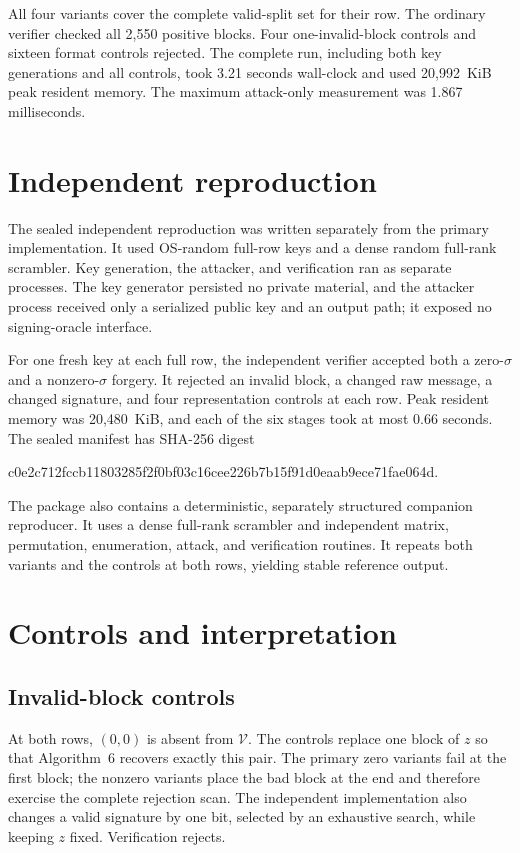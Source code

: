 \documentclass[10pt,a4paper]{article}
\newcommand{\VES}{\mathcal{V}}
\begin{document}
All four variants cover the complete valid-split set for their row.  The
ordinary verifier checked all 2,550 positive blocks.  Four one-invalid-block
controls and sixteen format controls rejected.  The complete run, including
both key generations and all controls, took 3.21 seconds wall-clock and used
20,992~KiB peak resident memory.  The maximum attack-only measurement was
1.867 milliseconds.

\section{Independent reproduction}

The sealed independent reproduction was written separately from the primary
implementation.  It used OS-random full-row keys and a dense random full-rank
scrambler.  Key generation, the attacker, and verification ran as separate
processes.  The key generator persisted no private material, and the attacker
process received only a serialized public key and an output path; it exposed
no signing-oracle interface.

For one fresh key at each full row, the independent verifier accepted both a
zero-$\sigma$ and a nonzero-$\sigma$ forgery.  It rejected an invalid block, a
changed raw message, a changed signature, and four representation controls at
each row.  Peak resident memory was 20,480~KiB, and each of the six stages took
at most 0.66 seconds.  The sealed manifest has SHA-256 digest
\begin{center}
\small\ttfamily
c0e2c712fccb11803285f2f0bf03c16cee226b7b15f91d0eaab9ece71fae064d.
\end{center}

The package also contains a deterministic, separately structured companion
reproducer.  It uses a dense full-rank scrambler and independent matrix,
permutation, enumeration, attack, and verification routines.  It repeats both
variants and the controls at both rows, yielding stable reference output.

\section{Controls and interpretation}

\subsection{Invalid-block controls}

At both rows, $(0,0)$ is absent from $\VES$.  The controls replace one block
of $z$ so that Algorithm~6 recovers exactly this pair.  The primary zero
variants fail at the first block; the nonzero variants place the bad block at
the end and therefore exercise the complete rejection scan.  The independent
implementation also changes a valid signature by one bit, selected by an
exhaustive search, while keeping $z$ fixed.  Verification rejects.
\end{document}
